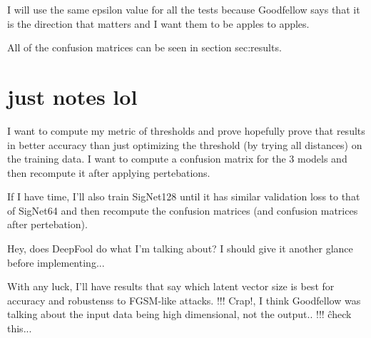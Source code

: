 I will use the same epsilon value for all the tests because Goodfellow says that it is the direction that matters and I want them to be apples to apples.

All of the confusion matrices can be seen in section {sec:results}.



\section{just notes lol}
I want to compute my metric of thresholds and prove hopefully prove that results in better accuracy than just optimizing the threshold (by trying all distances) on the training data.
I want to compute a confusion matrix for the 3 models and then recompute it after applying pertebations.

If I have time, I'll also train SigNet128 until it has similar validation loss to that of SigNet64 and then recompute the confusion matrices (and confusion matrices after pertebation).

Hey, does DeepFool do what I'm talking about?
    I should give it another glance before implementing...

With any luck, I'll have results that say which latent vector size is best for accuracy and robustenss to FGSM-like attacks.
!!! Crap!, I think Goodfellow was talking about the input data being high dimensional, not the output.. !!!
    \^check this...
